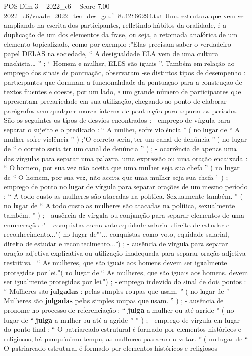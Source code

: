 \begin{textsample}{POS Dim 3 – 2022\_c6 – Score 7.00 – 2022\_c6/enade\_2022\_tec\_des\_graf\_8c42866294.txt}
Uma estrutura que vem se ampliando na escrita dos participantes, refletindo hábitos da oralidade, é a duplicação de um dos elementos da frase, ou seja, a retomada anafórica de um elemento topicalizado, como por exemplo :"Elas precisam saber o verdadeiro papel DELAS na sociedade, “ A desigualdade ELA vem de uma cultura machista... ” ; “ Homem e mulher, ELES são iguais ”.
Também em relação ao emprego dos sinais de pontuação, observaram -se distintos tipos de desempenho : participantes que dominam a funcionalidade da pontuação para a construção de textos fluentes e coesos, por um lado, e um grande número de participantes que apresentam precariedade em sua utilização, chegando ao ponto de elaborar parágrafos sem qualquer marca interna de pontuação para separar os períodos.
São os seguintes os tipos de desvios encontrados : - emprego de vírgula para separar o sujeito e o predicado : “ A mulher, sofre violência ” ( no lugar de “ A mulher sofre violência ” ) ;"O correto seria, ter um canal de denúncia ” ( no lugar de “ o correto seria ter um canal de denúncia ” ) ; - ocorrência de apenas uma das vírgulas para separar uma palavra, uma expressão ou uma oração encaixada : “ O homem, por sua vez não aceita que uma mulher seja sua chefa ” ( no lugar de “ O homem, por sua vez, não aceita que uma mulher seja sua chefa ” ) ; - emprego de ponto no lugar de vírgula para separar orações de um mesmo período : “ A todo custo as mulheres são atacadas na política.
Sexualmente também. ” ( no lugar de “ A todo custo as mulheres são atacadas na política, sexualmente também. ” ) ; - ausência de vírgula ou conjunção para separar elementos de uma enumeração :"... conquistas como voto equidade salarial direito de estudar e reconhecimento..."( no lugar de""... conquistas como voto, equidade salarial, direito de estudar e reconhecimento...") ; - ausência de vírgula para separar oração adjetiva explicativa ou utilização inadequada para separar oração adjetiva restritiva : “ As mulheres, que são iguais aos homens devem ser igualmente protegidas por lei."( no lugar de “ As mulheres, que são iguais aos homens, devem ser igualmente protegidas por lei.") ; - emprego indevido do sinal de dois pontos : “ Mulheres são \textbf{julgadas} : pelas simples roupas que usam. ” ( no lugar de “ Mulheres são \textbf{julgadas} pelas simples roupas que usam. ” ) ; - ausência de pronome no processo de referenciação : “ \textbf{julga} a mulher ou até agride ” ( no lugar de “ \textbf{julga} a mulher ou até a agride ” ” ) ; - emprego de vírgula em lugar do ponto-final : “ O patriarcado estrutural é formado por elementos históricos e religiosos, há pouquíssimo tempo, as mulheres passaram a votar. ” ( no lugar de “ O patriarcado estrutural é formado por elementos históricos e religiosos.

\end{textsample}
